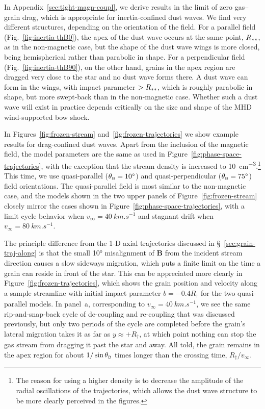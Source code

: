 In Appendix~\ref{sec:tight-magn-coupl}, we derive results in the limit
of zero gas--grain drag, which is appropriate for inertia-confined dust
waves. We find very different structures, depending on the orientation
of the field.  For a parallel field (Fig.~\ref{fig:inertia-thB0}), the
apex of the dust wave occurs at the same point, \(R_{**}\), as in
the non-magnetic case, but the shape of the dust wave wings is more
closed, being hemispherical rather than parabolic in shape.  For a
perpendicular field (Fig.~\ref{fig:inertia-thB90}), on the other hand,
grains in the apex region are dragged very close to the star and no
dust wave forms there.  A dust wave can form in the wings, with impact
parameter \(> R_{**}\), which is roughly parabolic in shape, but
more swept-back than in the non-magnetic case.  Whether such a dust
wave will exist in practice depends critically on the size and shape
of the MHD wind-supported bow shock.

In Figures~\ref{fig:frozen-stream} and~\ref{fig:frozen-trajectories}
we show example results for drag-confined dust waves. Apart from the
inclusion of the magnetic field, the model parameters are the same as
used in Figure~\ref{fig:phase-space-trajectories}, with the exception
that the stream density is increased to \SI{10}{cm^{-3}}.\footnote{The
  reason for using a higher density is to decrease the amplitude of
  the radial oscillations of the trajectories, which allows the dust
  wave structure to be more clearly perceived in the figures. } This
time, we use quasi-parallel (\(\theta_{\scriptscriptstyle\text{B}} = \ang{10}\)) and
quasi-perpendicular (\(\theta_{\scriptscriptstyle\text{B}} = \ang{75}\)) field orientations.  The
quasi-parallel field is most similar to the non-magnetic case, and the
models shown in the two upper panels of Figure~\ref{fig:frozen-stream}
closely mirror the cases shown in
Figure~\ref{fig:phase-space-trajectories}, with a limit cycle behavior
when \(v_\infty = \SI{40}{km.s^{-1}}\) and stagnant drift when
\(v_\infty = \SI{80}{km.s^{-1}}\).

The principle difference from the 1-D axial trajectories discussed in
\S~\ref{sec:grain-traj-along} is that the small \ang{10} misalignment
of \(\bm{B}\) from the incident stream direction causes a slow
sideways migration, which puts a finite limit on the time a grain can
reside in front of the star.  This can be appreciated more clearly in
Figure~\ref{fig:frozen-trajectories}, which shows the grain position
and velocity along a sample streamline with initial impact parameter
\(b = -0.4 R_\dag\) for the two quasi-parallel models.  In panel~a,
corresponding to \(v_\infty = \SI{40}{km.s^{-1}}\), we see the same
rip-and-snap-back cycle of de-coupling and re-coupling that was
discussed previously, but only two periods of the cycle are completed
before the grain's lateral migration takes it as far as
\(y \approx +R_\dag\), at which point nothing can stop the gas stream from
dragging it past the star and away.  All told, the grain remains in
the apex region for about \(1/\sin\theta_{\scriptscriptstyle\text{B}}\) times longer than the crossing
time, \(R_\dag / v_\infty\).

